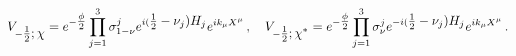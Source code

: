 \begin{equation}
 V_{-\textstyle{1\over 2}; \chi}= e^{-\textstyle{\phi\over 2}} \prod_{j=1}^3 \sigma_{1-\nu}^j
e^{i(\textstyle{1\over 2} -\nu_j)H_j} e^{ik_\mu X^\mu}\, ,
  \ \ \
  V_{-\textstyle{1\over 2};\chi^*}= e^{-\textstyle{\phi\over 2}} \prod_{j=1}^3
   \sigma_\nu^j e^{-i(\textstyle{1\over 2}-\nu_j)H_j} e^{ik_\mu
   X^\mu}\, .
\label{fer}\end{equation}


